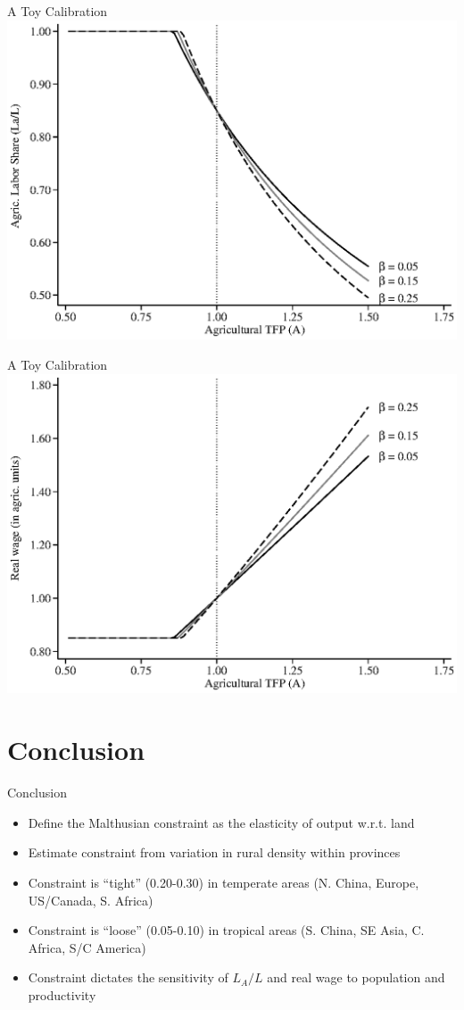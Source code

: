 \documentclass[10pt, xcolor=dvipsnames]{beamer}
\begin{document}
\begin{frame}{A Toy Calibration}
\includegraphics[width=.8\textwidth]{fig_sim_A_LaL.eps}
\end{frame}

\begin{frame}{A Toy Calibration}
\includegraphics[width=.8\textwidth]{fig_sim_A_w.eps}
\end{frame}

\section{Conclusion}

\begin{frame}{Conclusion}
\begin{itemize}
  \item Define the Malthusian constraint as the elasticity of output w.r.t. land
  \item Estimate constraint from variation in rural density within provinces
  \item Constraint is ``tight'' (0.20-0.30) in temperate areas (N. China, Europe, US/Canada, S. Africa)
  \item Constraint is ``loose'' (0.05-0.10) in tropical areas (S. China, SE Asia, C. Africa, S/C America)
  \item Constraint dictates the sensitivity of $L_A/L$ and real wage to population and productivity
\end{itemize}
\end{frame}
\end{document}
